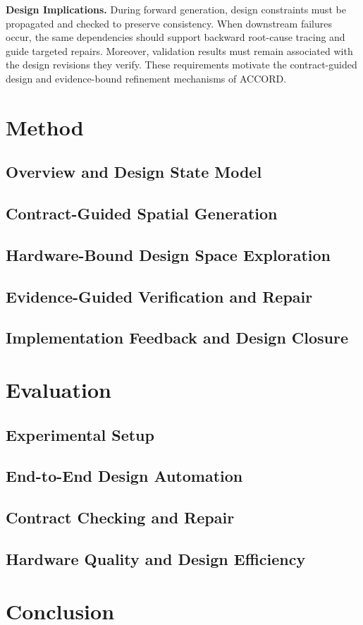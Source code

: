 \documentclass[conference]{IEEEtran}
\begin{document}
\noindent\textbf{Design Implications.} During forward generation, design constraints must be propagated and checked to preserve consistency. When downstream failures occur, the same dependencies should support backward root-cause tracing and guide targeted repairs. Moreover, validation results must remain associated with the design revisions they verify. These requirements motivate the contract-guided design and evidence-bound refinement mechanisms of ACCORD.


\section{Method}
\subsection{Overview and Design State Model}
\subsection{Contract-Guided Spatial Generation}
\subsection{Hardware-Bound Design Space Exploration}
\subsection{Evidence-Guided Verification and Repair}
\subsection{Implementation Feedback and Design Closure}

\section{Evaluation}
\subsection{Experimental Setup}
\subsection{End-to-End Design Automation}
\subsection{Contract Checking and Repair}
\subsection{Hardware Quality and Design Efficiency}

\section{Conclusion}



\vspace{12pt}
\clearpage
 
 
\end{document}
